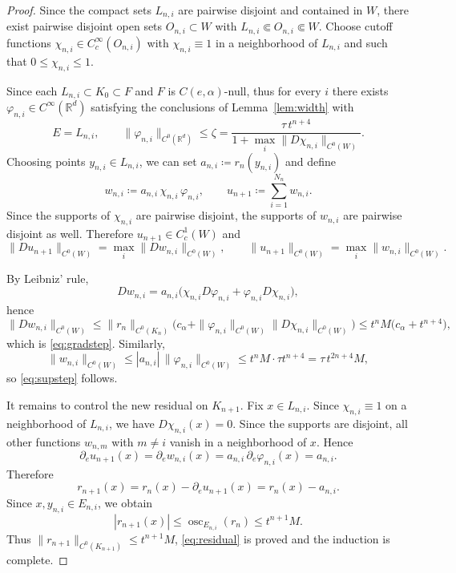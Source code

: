 \documentclass[10pt,a4paper]{amsart}
\newcommand{\R}{\mathbb{R}}
\newcommand{\osc}{\operatorname{osc}}
\begin{document}
\begin{proof}
Since the compact sets $L_{n,i}$ are pairwise disjoint and contained in $W$, there exist pairwise disjoint open sets $O_{n,i}\subset W$ with $L_{n,i}\Subset O_{n,i}\Subset W$.
Choose cutoff functions $\chi_{n,i}\in C^\infty_c(O_{n,i})$ with $\chi_{n,i}\equiv 1$ in a neighborhood of $L_{n,i}$ and such that $0\le \chi_{n,i}\le 1$.

Since each $L_{n,i}\subset K_0\subset F$ and $F$ is $C(e,\alpha)$-null,
thus for every $i$ there exists $\varphi_{n,i}\in C^\infty(\R^d)$ satisfying the conclusions of Lemma~\ref{lem:width} with
$$
E=L_{n,i},
\qquad
\|\varphi_{n,i}\|_{C^0(\mathbb{R}^d)}
\leq
\zeta
=\dfrac{\tau\,t^{n+4}}{1+\max_i \|D\chi_{n,i}\|_{C^0(W)}} .
$$
Choosing points $y_{n,i}\in L_{n,i}$, we can set $a_{n,i}\coloneqq r_n(y_{n,i})$ and define
$$
w_{n,i}\coloneqq a_{n,i}\,\chi_{n,i}\,\varphi_{n,i},
\qquad
u_{n+1}\coloneqq \sum_{i=1}^{N_n}w_{n,i}.
$$
Since the supports of $\chi_{n,i}$ are pairwise disjoint, the supports of $w_{n,i}$ are pairwise disjoint as well.
Therefore $u_{n+1}\in C^1_c(W)$ and
$$
\|Du_{n+1}\|_{C^0(W)} = \max_i \|Dw_{n,i}\|_{C^0(W)},
\qquad
\|u_{n+1}\|_{C^0(W)} = \max_i \|w_{n,i}\|_{C^0(W)}.
$$

By Leibniz' rule,
$$
Dw_{n,i}=a_{n,i}\bigl(\chi_{n,i}D\varphi_{n,i}+\varphi_{n,i}D\chi_{n,i}\bigr),
$$
hence
$$
\|Dw_{n,i}\|_{C^0(W)}
\le \|r_n\|_{C^0(K_n)}\bigl(c_\alpha+\|\varphi_{n,i}\|_{C^0(W)} \|D\chi_{n,i}\|_{C^0(W)}\bigr)
\le t^{n}M\bigl(c_\alpha+t^{n+4}\bigr),
$$
which is \eqref{eq:gradstep}.
Similarly,
$$
\|w_{n,i}\|_{C^0(W)}
\le |a_{n,i}|\,\|\varphi_{n,i}\|_{C^0(W)}
\le t^{n}M\cdot \tau t^{n+4}
= \tau\,t^{2n+4}M,
$$
so \eqref{eq:supstep} follows.

It remains to control the new residual on $K_{n+1}$.
Fix $x\in L_{n,i}$.
Since $\chi_{n,i}\equiv 1$ on a neighborhood of $L_{n,i}$, we have $D\chi_{n,i}(x)=0$.
Since the supports are disjoint, all other functions $w_{n,m}$ with $m\neq i$ vanish in a neighborhood of $x$.
Hence
$$
\partial_e u_{n+1}(x)=\partial_e w_{n,i}(x)=a_{n,i}\,\partial_e\varphi_{n,i}(x)=a_{n,i}.
$$
Therefore
$$
r_{n+1}(x)=r_n(x)-\partial_e u_{n+1}(x)=r_n(x)-a_{n,i}.
$$
Since $x,y_{n,i}\in E_{n,i}$, we obtain
$$
|r_{n+1}(x)|
\le \osc_{E_{n,i}}(r_n)
\le t^{n+1}M.
$$
Thus $\|r_{n+1}\|_{C^0(K_{n+1})}\le t^{n+1}M$, \eqref{eq:residual} is proved and the induction is complete.


\end{proof}
\end{document}
